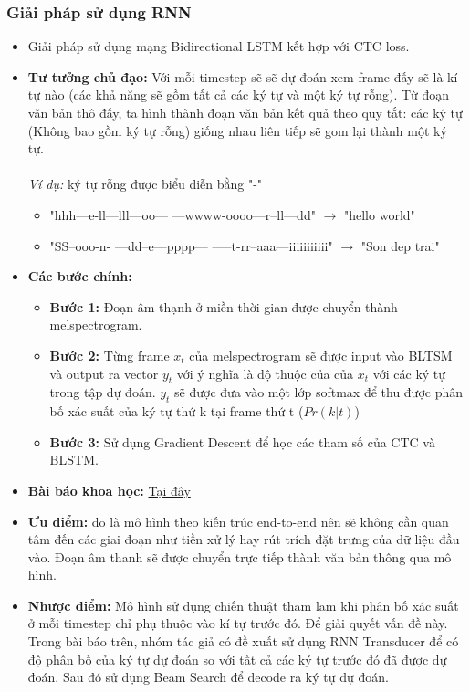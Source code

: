 \subsubsection{Giải pháp sử dụng RNN}
\begin{itemize}
	\item Giải pháp sử dụng mạng Bidirectional LSTM kết hợp với CTC loss.
	\item \textbf{Tư tưởng chủ đạo: }Với mỗi timestep sẽ sẽ dự đoán xem frame đấy sẽ là kí tự nào (các khả năng sẽ gồm tất cả các ký tự và một ký tự rỗng). Từ đoạn văn bản thô đấy, ta hình thành đoạn văn bản kết quả theo quy tắt: các ký tự (Không bao gồm ký tự rỗng) giống nhau liên tiếp sẽ gom lại thành một ký tự.\\
	\\
	\textit{Ví dụ:} ký tự rỗng được biểu diễn bằng "-"
	\begin{itemize}
		\item "hhh---e-ll---lll---oo--- ---wwww-oooo---r--ll---dd" $\rightarrow$ "hello world"
		\item "SS--ooo-n- ---dd--e---pppp--- -----t-rr--aaa---iiiiiiiiiii" $\rightarrow$ "Son dep trai"
	\end{itemize}
	\item \textbf{Các bước chính:}
	\begin{itemize}
		\item \textbf{Bước 1: }Đoạn âm thạnh ở miền thời gian được chuyển thành melspectrogram. 
		\item \textbf{Bước 2: }Từng frame $x_t$ của melspectrogram sẽ được input vào BLTSM và output ra vector $y_t$ với ý nghĩa là độ thuộc của của $x_t$ với các ký tự trong tập dự đoán. $y_t$ sẽ được đưa vào một lớp softmax để thu được phân bố xác suất của ký tự thứ k tại frame thứ t ($Pr(k\vert t)$)
		\item \textbf{Bước 3: }Sử dụng Gradient Descent để học các tham số của CTC và BLSTM.
	\end{itemize}
	\item \textbf{Bài báo khoa học: } \href{https://ieeexplore.ieee.org/document/6638947}{Tại đây}
	\item \textbf{Ưu điểm: }do là mô hình theo kiến trúc end-to-end nên sẽ không cần quan tâm đến các giai đoạn như tiền xử lý hay rút trích đặt trưng của dữ liệu đầu vào. Đoạn âm thanh sẽ được chuyển trực tiếp thành văn bản thông qua mô hình. 
	\item \textbf{Nhược điểm: }Mô hình sử dụng chiến thuật tham lam khi phân bố xác suất ở mỗi timestep chỉ phụ thuộc vào kí tự trước đó. Để giải quyết vấn đề này. Trong bài báo trên, nhóm tác giả có đề xuất sử dụng RNN Transducer để có độ phân bố của ký tự dự đoán so với tất cả các ký tự trước đó đã được dự đoán. Sau đó sử dụng Beam Search để decode ra ký tự dự đoán.

\end{itemize}
